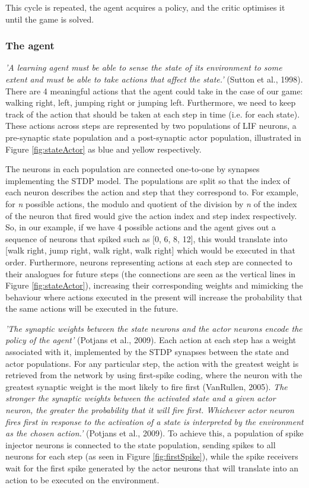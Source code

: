 \documentclass[10pt]{article}
\begin{document}
    This cycle is repeated, the agent acquires a policy, and the critic optimises it until the game is solved.

    \subsubsection{The agent}

    \textit{'A learning agent must be able to sense the state of its environment to some extent and must be able to take actions that affect the state.'} (Sutton et al., 1998). There are 4 meaningful actions that the agent could take in the case of our game: walking right, left, jumping right or jumping left. Furthermore, we need to keep track of the action that should be taken at each step in time (i.e. for each state). These actions across steps are represented by two populations of LIF neurons, a pre-synaptic state population and a post-synaptic actor population, illustrated in Figure \ref{fig:stateActor} as blue and yellow respectively.
    
    The neurons in each population are connected one-to-one by synapses implementing the STDP model. The populations are split so that the index of each neuron describes the action and step that they correspond to. For example, for \textit{n} possible actions, the modulo and quotient of the division by \textit{n} of the index of the neuron that fired would give the action index and step index respectively. So, in our example, if we have 4 possible actions and the agent gives out a sequence of neurons that spiked such as [0, 6, 8, 12], this would translate into [walk right, jump right, walk right, walk right] which would be executed in that order. Furthermore, neurons representing actions at each step are connected to their analogues for future steps (the connections are seen as the vertical lines in Figure \ref{fig:stateActor}), increasing their corresponding weights and mimicking the behaviour where actions executed in the present will increase the probability that the same actions will be executed in the future.

    \textit{'The synaptic weights between the state neurons and the actor neurons encode the policy of the agent'} (Potjans et al., 2009). Each action at each step has a weight associated with it, implemented by the STDP synapses between the state and actor populations. For any particular step, the action with the greatest weight is retrieved from the network by using first-spike coding, where the neuron with the greatest synaptic weight is the most likely to fire first (VanRullen, 2005). \textit{The stronger the synaptic weights between the activated state and a given actor
    neuron, the greater the probability that it will fire first. Whichever actor
    neuron fires first in response to the activation of a state is interpreted by
    the environment as the chosen action.'} (Potjans et al., 2009). To achieve this, a population of spike injector neurons is connected to the state population, sending spikes to all neurons for each step (as seen in Figure \ref{fig:firstSpike}), while the spike receivers wait for the first spike generated by the actor neurons that will translate into an action to be executed on the environment.
\end{document}
